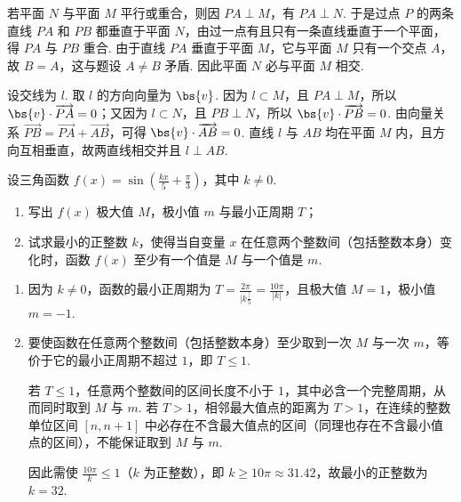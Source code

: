 \begin{solution}
若平面 \(N\) 与平面 \(M\) 平行或重合，则因 \(PA\perp M\)，有 \(PA\perp N\). 于是过点 \(P\) 的两条直线 \(PA\) 和 \(PB\) 都垂直于平面 \(N\)，由过一点有且只有一条直线垂直于一个平面，得 \(PA\) 与 \(PB\) 重合. 由于直线 \(PA\) 垂直于平面 \(M\)，它与平面 \(M\) 只有一个交点 \(A\)，故 \(B=A\)，这与题设 \(A\neq B\) 矛盾. 因此平面 \(N\) 必与平面 \(M\) 相交.

设交线为 \(l\). 取 \(l\) 的方向向量为 \(\bs{v}\). 因为 \(l\subset M\)，且 \(PA\perp M\)，所以 \(\bs{v}\cdot\overrightarrow{PA}=0\)；又因为 \(l\subset N\)，且 \(PB\perp N\)，所以 \(\bs{v}\cdot\overrightarrow{PB}=0\). 由向量关系 \(\overrightarrow{PB}=\overrightarrow{PA}+\overrightarrow{AB}\)，可得 \(\bs{v}\cdot\overrightarrow{AB}=0\). 直线 \(l\) 与 \(AB\) 均在平面 \(M\) 内，且方向互相垂直，故两直线相交并且 \(l\perp AB\).
\end{solution}

\begin{problem}
设三角函数 \(f(x)=\sin\left(\frac{kx}{5}+\frac{\pi}{3}\right)\)，其中 \(k\neq0\).

\begin{enumerate}
\item 写出 \(f(x)\) 极大值 \(M\)，极小值 \(m\) 与最小正周期 \(T\)；
\item 试求最小的正整数 \(k\)，使得当自变量 \(x\) 在任意两个整数间（包括整数本身）变化时，函数 \(f(x)\) 至少有一个值是 \(M\) 与一个值是 \(m\).
\end{enumerate}
\end{problem}

\begin{solution}
\begin{enumerate}
\item 因为 \(k\neq0\)，函数的最小正周期为 \(T=\frac{2\pi}{\lvert k\frac{\rvert}{5}}=\frac{10\pi}{\lvert k\rvert}\)，且极大值 \(M=1\)，极小值 \(m=-1\).
\item 要使函数在任意两个整数间（包括整数本身）至少取到一次 \(M\) 与一次 \(m\)，等价于它的最小正周期不超过 \(1\)，即 \(T\leqslant1\).

若 \(T\leqslant1\)，任意两个整数间的区间长度不小于 \(1\)，其中必含一个完整周期，从而同时取到 \(M\) 与 \(m\). 若 \(T>1\)，相邻最大值点的距离为 \(T>1\)，在连续的整数单位区间 \([n,n+1]\) 中必存在不含最大值点的区间（同理也存在不含最小值点的区间），不能保证取到 \(M\) 与 \(m\).

因此需使 \(\frac{10\pi}{k}\leqslant1\)（\(k\) 为正整数），即 \(k\geqslant10\pi\approx31.42\)，故最小的正整数为 \(k=32\).
\end{enumerate}
\end{solution}

